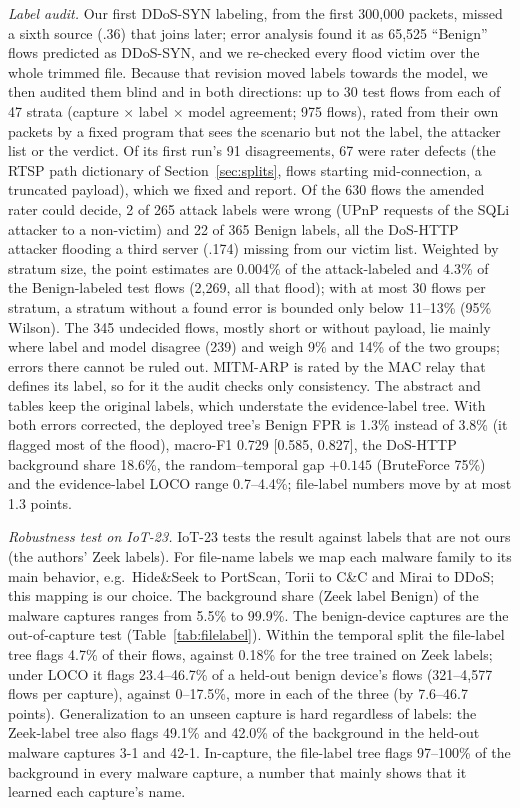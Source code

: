 \emph{Label audit.} Our first DDoS-SYN labeling, from the first 300,000 packets, missed a sixth source (.36) that joins later; error analysis found it as 65,525 ``Benign'' flows predicted as DDoS-SYN, and we re-checked every flood victim over the whole trimmed file. Because that revision moved labels towards the model, we then audited them blind and in both directions: up to 30 test flows from each of 47 strata (capture $\times$ label $\times$ model agreement; 975 flows), rated from their own packets by a fixed program that sees the scenario but not the label, the attacker list or the verdict. Of its first run's 91 disagreements, 67 were rater defects (the RTSP path dictionary of Section~\ref{sec:splits}, flows starting mid-connection, a truncated payload), which we fixed and report. Of the 630 flows the amended rater could decide, 2 of 265 attack labels were wrong (UPnP requests of the SQLi attacker to a non-victim) and 22 of 365 Benign labels, all the DoS-HTTP attacker flooding a third server (.174) missing from our victim list. Weighted by stratum size, the point estimates are 0.004\% of the attack-labeled and 4.3\% of the Benign-labeled test flows (2,269, all that flood); with at most 30 flows per stratum, a stratum without a found error is bounded only below 11--13\% (95\% Wilson). The 345 undecided flows, mostly short or without payload, lie mainly where label and model disagree (239) and weigh 9\% and 14\% of the two groups; errors there cannot be ruled out. MITM-ARP is rated by the MAC relay that defines its label, so for it the audit checks only consistency. The abstract and tables keep the original labels, which understate the evidence-label tree. With both errors corrected, the deployed tree's Benign FPR is 1.3\% instead of 3.8\% (it flagged most of the flood), macro-F1 0.729 [0.585, 0.827], the DoS-HTTP background share 18.6\%, the random--temporal gap $+0.145$ (BruteForce 75\%) and the evidence-label LOCO range 0.7--4.4\%; file-label numbers move by at most 1.3 points.

\emph{Robustness test on IoT-23.} IoT-23 tests the result against labels that are not ours (the authors' Zeek labels). For file-name labels we map each malware family to its main behavior, e.g.\ Hide\&Seek to PortScan, Torii to C\&C and Mirai to DDoS; this mapping is our choice. The background share (Zeek label Benign) of the malware captures ranges from 5.5\% to 99.9\%. The benign-device captures are the out-of-capture test (Table~\ref{tab:filelabel}). Within the temporal split the file-label tree flags 4.7\% of their flows, against 0.18\% for the tree trained on Zeek labels; under LOCO it flags 23.4--46.7\% of a held-out benign device's flows (321--4,577 flows per capture), against 0--17.5\%, more in each of the three (by 7.6--46.7 points). Generalization to an unseen capture is hard regardless of labels: the Zeek-label tree also flags 49.1\% and 42.0\% of the background in the held-out malware captures 3-1 and 42-1. In-capture, the file-label tree flags 97--100\% of the background in every malware capture, a number that mainly shows that it learned each capture's name.

